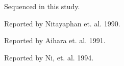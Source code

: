\documentclass{report}
\begin{document}
\begin{table}[h]
	\centering
	\begin{ThreePartTable}

	\caption{Amino acid substitutions differentiating the SA14 strain sequenced in this study to 
		that of three others previously reported.}

	\label{my-label}
	
	\begin{tablenotes}
	\item[a] Sequenced in this study.
	\item[b] Reported by Nitayaphan et. al. 1990.
	\item[c] Reported by Aihara et. al. 1991.
	\item[d] Reported by Ni, et. al. 1994.		
	\end{tablenotes}
	\end{ThreePartTable}
\end{table}
\end{document}
